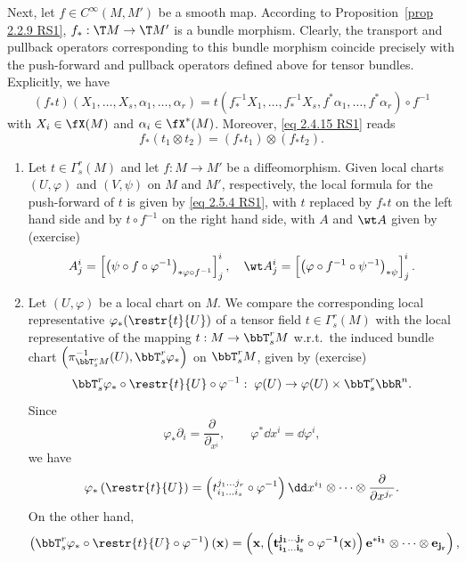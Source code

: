 Next, let $f\in C^\infty(M,M')$ be a smooth map. According to Proposition~\ref{prop 2.2.9 RS1}, $f_\ast:\T M\to \T M'$ is a bundle morphism. Clearly, the transport and pullback operators corresponding to this bundle morphism coincide precisely with the push-forward and pullback operators defined above for tensor bundles. Explicitly, we have 
\[(f_\ast t)(X_1,\ldots,X_s,\alpha_1,\ldots,\alpha_r)=t\left(f_\ast^{-1}X_1,\ldots,f_\ast^{-1}X_s,f^\ast\alpha_1,\ldots,f^\ast \alpha_r\right)\circ f^{-1}\]
with $X_i\in\fX(M)$ and $\alpha_i\in\fX^\ast(M)$. Moreover, \eqref{eq 2.4.15 RS1} reads 
\[f_\ast(t_1\otimes t_2)=(f_\ast t_1)\otimes (f_\ast t_2).\]


\begin{rem}\label{rem 2.5.3 RS1}
    \begin{enumerate}
        \item Let $t\in \Gamma^r_s(M)$ and let $f:M\to M'$ be a diffeomorphism. Given local charts $(U,\varphi)$ and $(V,\psi)$ on $M$ and $M'$, respectively, the local formula for the push-forward of $t$ is given by \eqref{eq 2.5.4 RS1}, with $t$ replaced by $f_\ast t$ on the left hand side and by $t\circ f^{-1}$ on the right hand side, with $A$ and $\wt A$ given by (exercise)
        \[A^i_j=\left[\left(\psi\circ f\circ \varphi^{-1}\right)_{\ast \varphi\circ f^{-1}}\right]^i_j,\quad \wt A^i_j=\left[\left(\varphi\circ f^{-1}\circ \psi^{-1}\right)_{\ast \psi}\right]^i_j.\]
        \item Let $(U,\varphi)$ be a local chart on $M$. We compare the corresponding local representative $\varphi_\ast(\restr{t}{U})$ of a tensor field $t\in\Gamma^r_s(M)$ with the local representative of the mapping $t:M\to \bbT^r_s M$ w.r.t.\ the induced bundle chart $\left(\pi_{\bbT^r_s M}^{-1}(U),\bbT^r_s \varphi_\ast\right)$ on $\bbT^r_s M$, given by (exercise)
        \[\bbT^r_s\varphi_\ast\circ \restr{t}{U}\circ \varphi^{-1}:\; \varphi(U)\to \varphi(U)\times\bbT^r_s\bbR^n.\]
        Since 
        \[\varphi_\ast \partial_i=\frac{\partial}{\partial_{x^i}},\quad\quad \varphi^\ast \dd x^i=\dd\varphi^i,\label{eq 2.5.9 RS1}\] 
        we have 
        \[\varphi_\ast\left(\restr{t}{U}\right)=\left(t^{j_1\ldots j_r}_{i_1\ldots i_s}\circ\varphi^{-1}\right)\dd x^{i_1}\otimes\cdots\otimes \frac{\partial}{\partial x^{j_r}}.\]
        On the other hand, 
        \[\left(\bbT^r_s\varphi_\ast\circ \restr{t}{U}\circ\varphi^{-1}\right)(\bf x)=\left(\bf x,\left(t^{j_1\ldots j_r}_{i_1\ldots i_s}\circ \varphi^{-1}(\bf x)\right)\bf e^{\ast i_1}\otimes\cdots\otimes \bf e_{j_r}\right),\]

\end{enumerate}
\end{rem}

